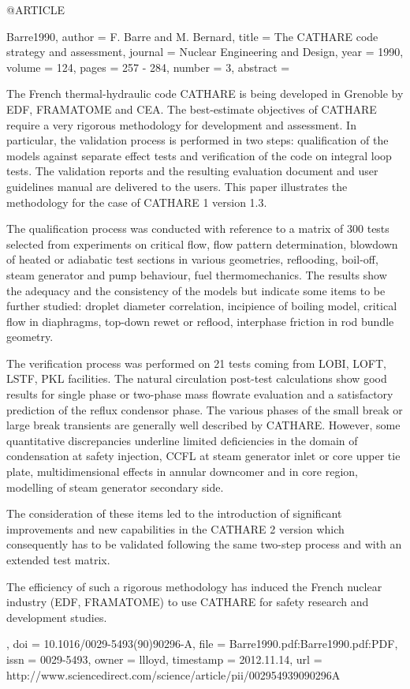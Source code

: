 @ARTICLE{Barre1990,
  author = {F. Barre and M. Bernard},
  title = {The {CATHARE} code strategy and assessment},
  journal = {Nuclear Engineering and Design},
  year = {1990},
  volume = {124},
  pages = {257 - 284},
  number = {3},
  abstract = {The French thermal-hydraulic code CATHARE is being developed in Grenoble
	by EDF, FRAMATOME and CEA. The best-estimate objectives of CATHARE
	require a very rigorous methodology for development and assessment.
	In particular, the validation process is performed in two steps:
	qualification of the models against separate effect tests and verification
	of the code on integral loop tests. The validation reports and the
	resulting evaluation document and user guidelines manual are delivered
	to the users. This paper illustrates the methodology for the case
	of CATHARE 1 version 1.3.
	
	The qualification process was conducted with reference to a matrix
	of 300 tests selected from experiments on critical flow, flow pattern
	determination, blowdown of heated or adiabatic test sections in various
	geometries, reflooding, boil-off, steam generator and pump behaviour,
	fuel thermomechanics. The results show the adequacy and the consistency
	of the models but indicate some items to be further studied: droplet
	diameter correlation, incipience of boiling model, critical flow
	in diaphragms, top-down rewet or reflood, interphase friction in
	rod bundle geometry.
	
	The verification process was performed on 21 tests coming from LOBI,
	LOFT, LSTF, PKL facilities. The natural circulation post-test calculations
	show good results for single phase or two-phase mass flowrate evaluation
	and a satisfactory prediction of the reflux condensor phase. The
	various phases of the small break or large break transients are generally
	well described by CATHARE. However, some quantitative discrepancies
	underline limited deficiencies in the domain of condensation at safety
	injection, CCFL at steam generator inlet or core upper tie plate,
	multidimensional effects in annular downcomer and in core region,
	modelling of steam generator secondary side.
	
	The consideration of these items led to the introduction of significant
	improvements and new capabilities in the CATHARE 2 version which
	consequently has to be validated following the same two-step process
	and with an extended test matrix.
	
	The efficiency of such a rigorous methodology has induced the French
	nuclear industry (EDF, FRAMATOME) to use CATHARE for safety research
	and development studies.},
  doi = {10.1016/0029-5493(90)90296-A},
  file = {Barre1990.pdf:Barre1990.pdf:PDF},
  issn = {0029-5493},
  owner = {llloyd},
  timestamp = {2012.11.14},
  url = {http://www.sciencedirect.com/science/article/pii/002954939090296A}
}

